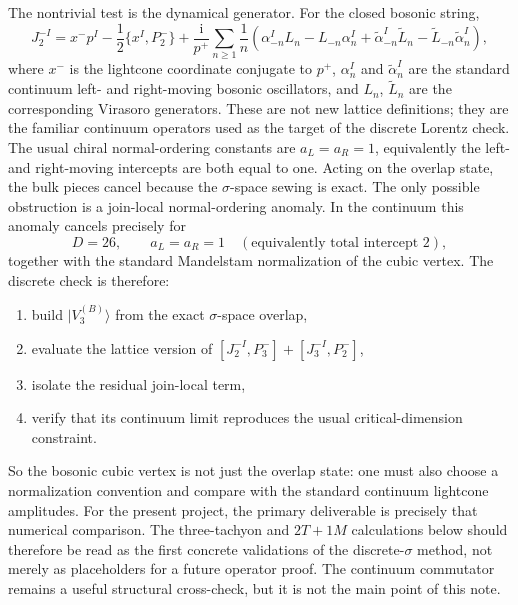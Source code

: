 \documentclass[11pt]{article}
\numberwithin{equation}{section}
\newcommand{\ii}{\mathrm{i}}
\begin{document}
The nontrivial test is the dynamical generator. For the closed bosonic string,
\begin{equation}
\label{eq:s12-010}
J^{-I}_2
=
x^- p^I
-\frac12 \{x^I,P^-_2\}
+\frac{\ii}{p^+}\sum_{n\ge 1}\frac{1}{n}
\left(
\alpha_{-n}^I L_n - L_{-n}\alpha_n^I
+\tilde\alpha_{-n}^I \tilde L_n - \tilde L_{-n}\tilde\alpha_n^I
\right),
\end{equation}
where $x^-$ is the lightcone coordinate conjugate to $p^+$, $\alpha_n^I$ and $\tilde\alpha_n^I$ are the standard continuum left- and right-moving bosonic oscillators, and $L_n$, $\tilde L_n$ are the corresponding Virasoro generators. These are not new lattice definitions; they are the familiar continuum operators used as the target of the discrete Lorentz check. The usual chiral normal-ordering constants are $a_L=a_R=1$, equivalently the left- and right-moving intercepts are both equal to one. Acting on the overlap state, the bulk pieces cancel because the $\sigma$-space sewing is exact. The only possible obstruction is a join-local normal-ordering anomaly. In the continuum this anomaly cancels precisely for
\begin{equation}
\label{eq:s12-011}
D=26,
\qquad
a_L=a_R=1
\quad
(\text{equivalently total intercept }2),
\end{equation}
together with the standard Mandelstam normalization of the cubic vertex. The discrete check is therefore:
\begin{enumerate}
\item build $|V_3^{(B)}\rangle$ from the exact $\sigma$-space overlap,
\item evaluate the lattice version of $[J^{-I}_2,P^-_3] + [J^{-I}_3,P^-_2]$,
\item isolate the residual join-local term,
\item verify that its continuum limit reproduces the usual critical-dimension constraint.
\end{enumerate}
So the bosonic cubic vertex is not just the overlap state: one must also choose a normalization convention and compare with the standard continuum lightcone amplitudes. For the present project, the primary deliverable is precisely that numerical comparison. The three-tachyon and $2T+1M$ calculations below should therefore be read as the first concrete validations of the discrete-$\sigma$ method, not merely as placeholders for a future operator proof. The continuum commutator remains a useful structural cross-check, but it is not the main point of this note.
\end{document}
